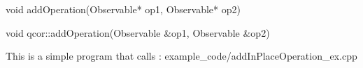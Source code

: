 
\begin{apidefinition}

\begin{Csynopsis}
    void addOperation(Observable* op1, Observable* op2)
\end{Csynopsis}

\begin{Cppsynopsis}
    void qcor::addOperation(Observable &op1, Observable &op2)
\end{Cppsynopsis}


\begin{apiarguments}
\end{apiarguments}



\apinotes{
    
}

\begin{apiexamples}

\apicppexample
    { This is a simple program that calls : } 
    { example_code/addInPlaceOperation_ex.cpp} 
    {}

\end{apiexamples}

\end{apidefinition}
